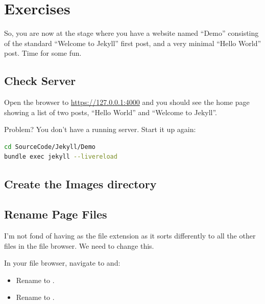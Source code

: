 \chapter{Exercises}\label{chap: Exercises}

So, you are now at the stage where you have a website named ``Demo'' consisting of the standard ``Welcome to Jekyll'' first post, and a very minimal ``Hello World'' post. Time for some fun.

\section{Check Server}

Open the browser to \url{https://127.0.0.1:4000} and you should see the home page showing a list of two posts, ``Hello World'' and ``Welcome to Jekyll''.

Problem? You don't have a running server. Start it up again:

\begin{lstlisting}[style=mystyle,language=bash]
cd SourceCode/Jekyll/Demo
bundle exec jekyll --livereload
\end{lstlisting}

\section{Create the Images directory}

\section{Rename Page Files}

I'm not fond of having  as the file extension as it sorts differently to all the other  files in the file browser. We need to change this.

In your file browser, navigate to  and:

\begin{itemize}
    \item Rename  to .
    \item Rename  to .
\end{itemize}

